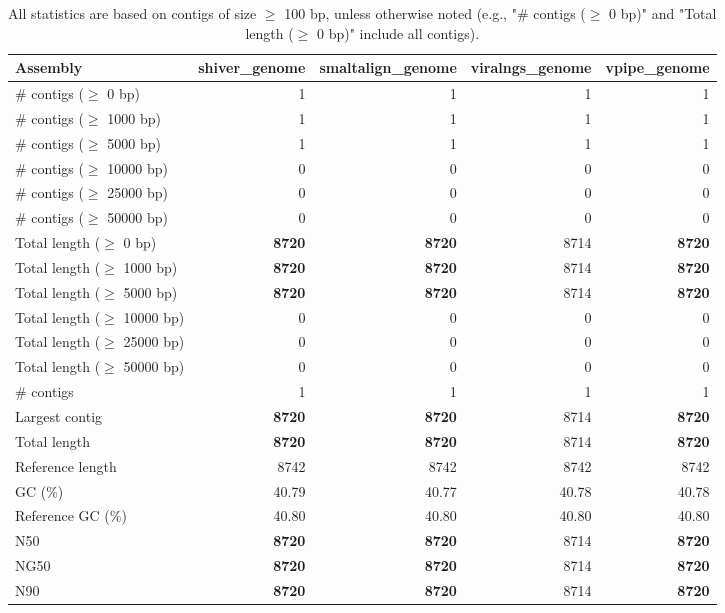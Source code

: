 \documentclass[12pt,a4paper]{article}
\begin{document}
\begin{table}[ht]
\begin{center}
\caption{All statistics are based on contigs of size $\geq$ 100 bp, unless otherwise noted (e.g., "\# contigs ($\geq$ 0 bp)" and "Total length ($\geq$ 0 bp)" include all contigs).}
\begin{tabular}{|l*{4}{|r}|}
\hline
Assembly & shiver\_genome & smaltalign\_genome & viralngs\_genome & vpipe\_genome \\ \hline
\# contigs ($\geq$ 0 bp) & 1 & 1 & 1 & 1 \\ \hline
\# contigs ($\geq$ 1000 bp) & 1 & 1 & 1 & 1 \\ \hline
\# contigs ($\geq$ 5000 bp) & 1 & 1 & 1 & 1 \\ \hline
\# contigs ($\geq$ 10000 bp) & 0 & 0 & 0 & 0 \\ \hline
\# contigs ($\geq$ 25000 bp) & 0 & 0 & 0 & 0 \\ \hline
\# contigs ($\geq$ 50000 bp) & 0 & 0 & 0 & 0 \\ \hline
Total length ($\geq$ 0 bp) & {\bf 8720} & {\bf 8720} & 8714 & {\bf 8720} \\ \hline
Total length ($\geq$ 1000 bp) & {\bf 8720} & {\bf 8720} & 8714 & {\bf 8720} \\ \hline
Total length ($\geq$ 5000 bp) & {\bf 8720} & {\bf 8720} & 8714 & {\bf 8720} \\ \hline
Total length ($\geq$ 10000 bp) & 0 & 0 & 0 & 0 \\ \hline
Total length ($\geq$ 25000 bp) & 0 & 0 & 0 & 0 \\ \hline
Total length ($\geq$ 50000 bp) & 0 & 0 & 0 & 0 \\ \hline
\# contigs & 1 & 1 & 1 & 1 \\ \hline
Largest contig & {\bf 8720} & {\bf 8720} & 8714 & {\bf 8720} \\ \hline
Total length & {\bf 8720} & {\bf 8720} & 8714 & {\bf 8720} \\ \hline
Reference length & 8742 & 8742 & 8742 & 8742 \\ \hline
GC (\%) & 40.79 & 40.77 & 40.78 & 40.78 \\ \hline
Reference GC (\%) & 40.80 & 40.80 & 40.80 & 40.80 \\ \hline
N50 & {\bf 8720} & {\bf 8720} & 8714 & {\bf 8720} \\ \hline
NG50 & {\bf 8720} & {\bf 8720} & 8714 & {\bf 8720} \\ \hline
N90 & {\bf 8720} & {\bf 8720} & 8714 & {\bf 8720} \\ \hline

\end{tabular}
\end{center}
\end{table}
\end{document}
